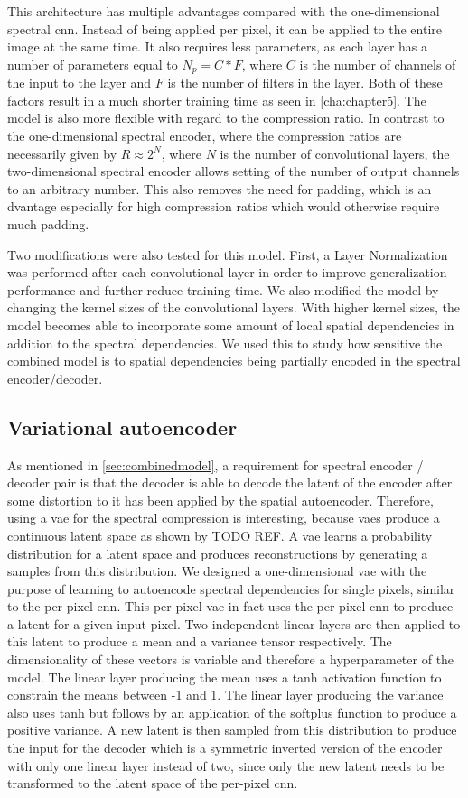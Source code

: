This architecture has multiple advantages compared with the one-dimensional spectral \ac{cnn}. Instead of being applied per pixel, it can be applied to the entire image at the same time. It also requires less parameters, as each layer has a number of parameters equal to $N_p = C * F$, where $C$ is the number of channels of the input to the layer and $F$ is the number of filters in the layer. Both of these factors result in a much shorter training time as seen in \autoref{cha:chapter5}. The model is also more flexible with regard to the compression ratio. In contrast to the one-dimensional spectral encoder, where the compression ratios are necessarily given by $R \approx 2^N$, where $N$ is the number of convolutional layers, the two-dimensional spectral encoder allows setting of the number of output channels to an arbitrary number. This also removes the need for padding, which is an dvantage especially for high compression ratios which would otherwise require much padding.

Two modifications were also tested for this model. First, a Layer Normalization was performed after each convolutional layer in order to improve generalization performance and further reduce training time.  We also modified the model by changing the kernel sizes of the convolutional layers. With higher kernel sizes, the model becomes able to incorporate some amount of local spatial dependencies in addition to the spectral dependencies. We used this to study how sensitive the combined model is to spatial dependencies being partially encoded in the spectral encoder/decoder.
\subsection{Variational autoencoder \label{sec:vae}}
As mentioned in \autoref{sec:combinedmodel}, a requirement for spectral encoder / decoder pair is that the decoder is able to decode the latent of the encoder after some distortion to it has been applied by the spatial autoencoder. Therefore, using a \ac{vae} for the spectral compression is interesting, because \acp{vae} produce a continuous latent space as shown by TODO REF. A \ac{vae} learns a probability distribution for a latent space and produces reconstructions by generating a samples from this distribution. We designed a one-dimensional \ac{vae} with the purpose of learning to autoencode spectral dependencies for single pixels, similar to the per-pixel \ac{cnn}. This per-pixel \ac{vae} in fact uses the per-pixel \ac{cnn} to produce a latent for a given input pixel. Two independent linear layers are then applied to this latent to produce a mean and a variance tensor respectively. The dimensionality of these vectors is variable and therefore a hyperparameter of the model. The linear layer producing the mean uses a tanh activation function to constrain the means between -1 and 1. The linear layer producing the variance also uses tanh but follows by an application of the softplus function to produce a positive variance. A new latent is then sampled from this distribution to produce the input for the decoder which is a symmetric inverted version of the encoder with only one linear layer instead of two, since only the new latent needs to be transformed to the latent space of the per-pixel \ac{cnn}.

